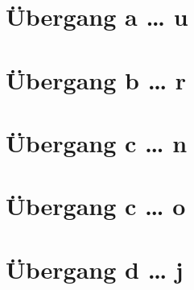 \documentclass[a4paper,landscape]{article}
\begin{document}
\hspace*{-1ex}
\newpage

\section{Übergang a … u }

\hspace*{-1ex}
\newpage

\section{Übergang b … r }

\hspace*{-1ex}
\newpage

\section{Übergang c … n }

\hspace*{-1ex}
\newpage

\section{Übergang c … o }

\hspace*{-1ex}
\newpage

\section{Übergang d … j }

\hspace*{-1ex}
\newpage
\end{document}
